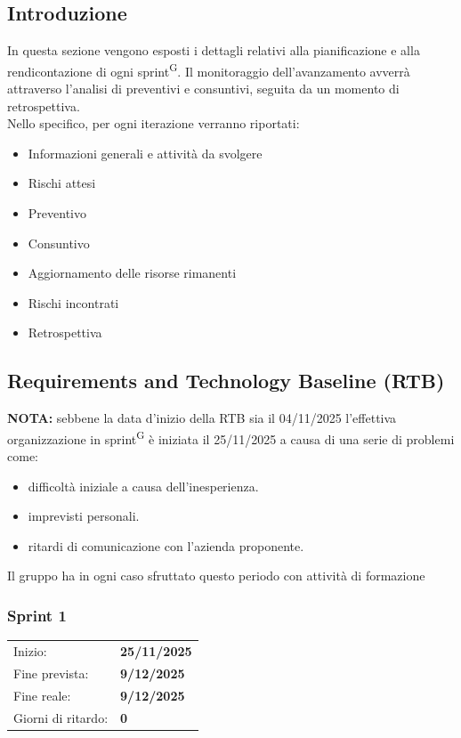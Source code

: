 \documentclass[a4paper, 11pt]{article}
\begin{document}
\subsection{Introduzione}
In questa sezione vengono esposti i dettagli relativi alla pianificazione e alla rendicontazione di ogni sprint\textsuperscript{G}. Il monitoraggio dell'avanzamento avverrà attraverso l'analisi di preventivi e consuntivi, seguita da un momento di retrospettiva.\\
Nello specifico, per ogni iterazione verranno riportati:
\begin{itemize}
  \item Informazioni generali e attività da svolgere
  \item Rischi attesi
  \item Preventivo
  \item Consuntivo
  \item Aggiornamento delle risorse rimanenti
  \item Rischi incontrati
  \item Retrospettiva
\end{itemize}

\subsection{Requirements and Technology Baseline (RTB)}

\textbf{NOTA: } sebbene la data d'inizio della RTB sia il 04/11/2025 l'effettiva organizzazione in sprint\textsuperscript{G} è iniziata il 25/11/2025 a causa di una serie di problemi come:
\begin{itemize}
  \item difficoltà iniziale a causa dell'inesperienza.
  \item imprevisti personali.
  \item ritardi di comunicazione con l'azienda proponente.
\end{itemize}
Il gruppo ha in ogni caso sfruttato questo periodo con attività di formazione

\subsubsection{Sprint 1}
\begin{tabular}{ll}
Inizio: & \textbf{25/11/2025} \\
Fine prevista: & \textbf{9/12/2025} \\
Fine reale: & \textbf{9/12/2025} \\
Giorni di ritardo: & \textbf{0} \\
\end{tabular}
\end{document}
